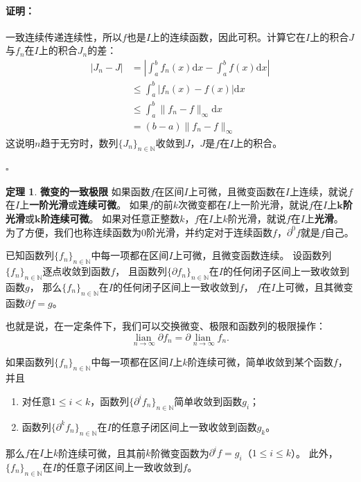 \documentclass[12pt,UTF8]{ctexbook}
\newcommand{\lian}[1]{
    \underset{#1}{\operatorname{lian}\,}
}
\theoremstyle{definition}
\newtheorem{tm}{定理}[section]
\theoremstyle{plain}
\renewenvironment{proof}{\paragraph{\textbf{证明：}}}{\hfill$\square$}
\begin{document}
\begin{appendix}
\begin{proof}
    一致连续传递连续性，所以$f$也是$I$上的连续函数，因此可积。计算它在$I$上的积合$J$与$f_n$在$I$上的积合$J_n$的差：
    \begin{align*}
        |J_n - J| &= \left|\int_a^b f_n(x)\mathrm{d}x - \int_a^b f(x)\mathrm{d}x \right| \\
        &\leqslant \int_a^b \left| f_n(x) - f(x)\right| \mathrm{d}x \\
        &\leqslant \int_a^b \| f_n - f\|_{\infty} \mathrm{d}x \\
        &= (b - a) \| f_n - f\|_{\infty}
    \end{align*}
    这说明$n$趋于无穷时，数列$\{J_n\}_{n\in\mathbb{N}}$收敛到$J$，$J$是$f$在$I$上的积合。

\end{proof}

\begin{tm}{\textbf{微变的一致极限}}
    如果函数$f$在区间$I$上可微，且微变函数在$I$上连续，就说$f$在$I$上\textbf{一阶光滑}或\textbf{连续可微}。
    如果$f$的前$k$次微变都在$I$上一阶光滑，就说$f$在$I$上$\boldsymbol{k}$\textbf{阶光滑}或$\boldsymbol{k}$\textbf{阶连续可微}。
    如果对任意正整数$k$，$f$在$I$上$k$阶光滑，就说$f$在$I$上\textbf{光滑}。
    为了方便，我们也称连续函数为$0$阶光滑，并约定对于连续函数$f$，$\partial^0 f$就是$f$自己。

    已知函数列$\{f_n\}_{n\in\mathbb{N}}$中每一项都在区间$I$上可微，且微变函数连续。
    设函数列$\{f_n\}_{n\in\mathbb{N}}$逐点收敛到函数$f$，
    且函数列$\{\partial f_n\}_{n\in\mathbb{N}}$在$I$的任何闭子区间上一致收敛到函数$g$，
    那么$\{f_n\}_{n\in\mathbb{N}}$在$I$的任何闭子区间上一致收敛到$f$，
    $f$在$I$上可微，且其微变函数$\partial f = g$。

    也就是说，在一定条件下，我们可以交换微变、极限和函数列的极限操作：
    $$ \lian{n\to \infty} \partial f_n = \partial \lian{n\to \infty} f_n. $$

    如果函数列$\{f_n\}_{n\in\mathbb{N}}$中每一项都在区间$I$上$k$阶连续可微，简单收敛到某个函数$f$，并且
    \begin{enumerate}
        \item 对任意$1 \leqslant i < k$，函数列$\{\partial^i f_n\}_{n\in\mathbb{N}}$简单收敛到函数$g_i$；
        \item 函数列$\{\partial^k f_n\}_{n\in\mathbb{N}}$在$I$的任意子闭区间上一致收敛到函数$g_k$。
    \end{enumerate}
    那么$f$在$I$上$k$阶连续可微，且其前$k$阶微变函数为$\partial^i f = g_i$（$1 \leqslant i\leqslant k$）。
    此外，$\{f_n\}_{n\in\mathbb{N}}$在$I$的任意子闭区间上一致收敛到$f$。


\end{tm}
\end{appendix}
\end{document}
